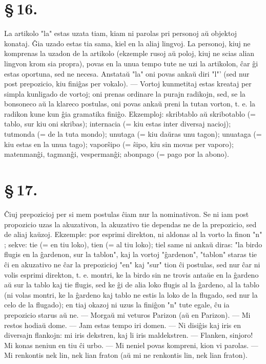 \section*{\S\,16.}
La artikolo "la" estas uzata tiam, kiam ni parolas pri personoj
a\u u objektoj konataj. \^Gia uzado estas tia sama, kiel en la aliaj
lingvoj. La personoj, kiuj ne komprenas la uzadon de la artikolo
(ekzemple rusoj a\u u poloj, kiuj ne scias alian lingvon krom sia
propra), povas en la unua tempo tute ne uzi la artikolon, \^car \^gi
estas oportuna, sed ne necesa. Anstata\u u "la" oni povas anka\u u
diri "l"' (sed nur post prepozicio, kiu fini\^gas per vokalo).
--- Vortoj kunmetitaj estas kreataj per simpla kunligado de vortoj;
oni prenas ordinare la purajn radikojn, sed, se la bonsoneco a\u u
la klareco postulas, oni povas anka\u u preni la tutan vorton, t. e.
la radikon kune kun \^gia gramatika fini\^go. Ekzemploj: skribtablo
a\u u skribotablo (= tablo, sur kiu oni skribas); internacia (= kiu
estas inter diversaj nacioj); tutmonda (= de la tuta mondo); unutaga
(= kiu da\u uras unu tagon); unuataga (= kiu estas en la unua tago);
vapor\^sipo (= \^sipo, kiu sin movas per vaporo); matenman\^gi,
tagman\^gi, vesperman\^gi; abonpago (= pago por la abono).


\section*{\S\,17.}
\^Ciuj prepozicioj per si mem postulas \^ciam nur la nominativon. Se
ni iam post propozicio uzas la akuzativon, la akuzativo tie dependas
ne de la prepozicio, sed de aliaj ka\u uzoj. Ekzemple: por esprimi
direkton, ni aldonas al la vorto la finon "n" ; sekve: tie (= en
tiu loko), tien (= al tiu loko); tiel same ni anka\u u diras: "la
birdo flugis en la \^gardenon, sur la tablon", kaj la vortoj
"\^gardenon", "tablon" staras tie \^ci en akuzativo ne \^car la
prepozicioj "en" kaj "sur" tion \^ci postulas, sed nur \^car ni
volis esprimi direkton, t. e. montri, ke la birdo sin ne trovis
anta\u ue en la \^gardeno a\u u sur la tablo kaj tie flugis, sed ke
\^gi de alia loko flugis al la \^gardeno, al la tablo (ni volas
montri, ke la \^gardeno kaj tablo ne estis la loko de la flugado,
sed nur la celo de la flugado); en tiaj okazoj ni uzus la fini\^gon
"n" tute egale, \^cu ia prepozicio starus a\u u ne. --- Morga\u u
mi veturos Parizon (a\u u en Parizon). --- Mi restos hodia\u u dome.
--- Jam estas tempo iri domen. --- Ni disi\^gis kaj iris en
diversajn flankojn: mi iris dekstren, kaj li iris maldekstren. ---
Flanken, sinjoro! Mi konas neniun en tiu \^ci urbo. --- Mi neniel
povas kompreni, kion vi parolas. --- Mi renkontis nek lin, nek lian
fraton (a\u u mi ne renkontis lin, nek lian fraton).


